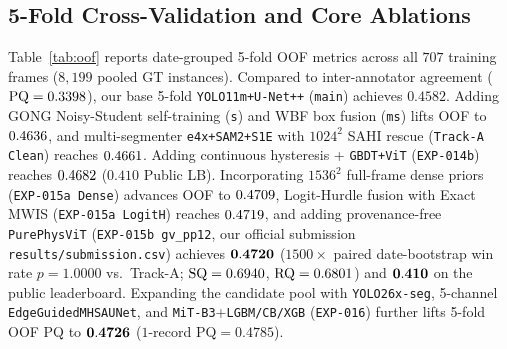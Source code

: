\documentclass[sigconf]{acmart}
\begin{document}
\subsection{5-Fold Cross-Validation and Core Ablations}
Table~\ref{tab:oof} reports date-grouped 5-fold OOF metrics across all $707$ training frames ($8{,}199$ pooled GT instances). Compared to inter-annotator agreement ($\mathrm{PQ}=0.3398$), our base 5-fold \texttt{YOLO11m+U-Net++} (\texttt{main}) achieves $0.4582$. Adding GONG Noisy-Student self-training (\texttt{s}) and WBF box fusion (\texttt{ms}) lifts OOF to $0.4636$, and multi-segmenter \texttt{e4x+SAM2+S1E} with $1024^2$ SAHI rescue (\texttt{Track-A Clean}) reaches $0.4661$. Adding continuous hysteresis + \texttt{GBDT+ViT} (\texttt{EXP-014b}) reaches $0.4682$ ($\mathbf{0.410}$ Public LB). Incorporating $1536^2$ full-frame dense priors (\texttt{EXP-015a Dense}) advances OOF to $0.4709$, Logit-Hurdle fusion with Exact MWIS (\texttt{EXP-015a LogitH}) reaches $0.4719$, and adding provenance-free \texttt{PurePhysViT} (\texttt{EXP-015b gv\_pp12}, our official submission \texttt{results/submission.csv}) achieves $\mathbf{0.4720}$ ($1500\times$ paired date-bootstrap win rate $p=1.0000$ vs.\ Track-A; $\mathrm{SQ}=0.6940$, $\mathrm{RQ}=0.6801$) and $\mathbf{0.410}$ on the public leaderboard. Expanding the candidate pool with \texttt{YOLO26x-seg}, 5-channel \texttt{Edge\allowbreak Guided\allowbreak MHSA\allowbreak UNet}, and \texttt{MiT-B3}+\texttt{LGBM/CB/XGB} (\texttt{EXP-016}) further lifts 5-fold OOF PQ to $\mathbf{0.4726}$ ($1$-record $\mathrm{PQ}=0.4785$).
\end{document}
